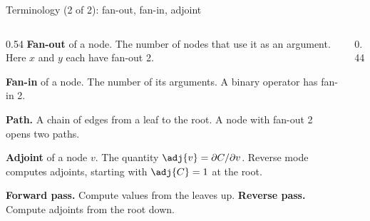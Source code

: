 \documentclass[aspectratio=169,xcolor=dvipsnames,svgnames,x11names,fleqn]{beamer}
\begin{document}
\begin{frame}{Terminology (2 of 2): fan-out, fan-in, adjoint}
\begin{columns}[T]
\begin{column}{0.54\textwidth}
\small
\textbf{Fan-out} of a node. The number of nodes that use it as an
argument. Here $x$ and $y$ each have fan-out 2.

\medskip
\textbf{Fan-in} of a node. The number of its arguments. A binary
operator has fan-in 2.

\medskip
\textbf{Path.} A chain of edges from a leaf to the root. A node with
fan-out 2 opens two paths.

\medskip
\textbf{Adjoint} of a node $v$. The quantity
$\adj{v} = \partial C / \partial v$. Reverse mode computes adjoints,
starting with $\adj{C} = 1$ at the root.

\medskip
\textbf{Forward pass.} Compute values from the leaves up.
\textbf{Reverse pass.} Compute adjoints from the root down.
\end{column}
\begin{column}{0.44\textwidth}
\centering
{}
\end{column}
\end{columns}
\end{frame}
\end{document}
